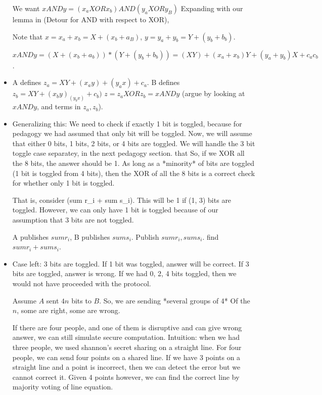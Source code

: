 \begin{itemize}
  We want $x AND y = (x_a XOR x_b) AND (y_a XOR y_B)$ Expanding with our lemma in (Detour for AND with respect to XOR),

  Note that $x = x_a + x_b = X + (x_b + a_B)$, $y = y_a + y_b = Y + (y_b + b_b)$.
  
  $x AND y = (X + (x_b + a_b)) * (Y + (y_b + b_b)) = (XY) + (x_a + x_b)Y + (y_a + y_b)X + c_a c_b$.


\item A defines $z_a = XY + (x_a y) + (y_a x) + c_a$. B defines $z_b = XY + (x_b y) _ (y_b x) + c_b)$
  $z = z_a XOR z_b = x AND y$ (argue by looking at $x AND y$, and terms in $z_a, z_b$).


\item Generalizing this: We need to check if exactly 1 bit is toggled, because for pedagogy we had assumed that only
  bit will be toggled. Now, we will assume that either 0 bits, 1 bits, 2 bits, or 4 bits are toggled. We will
  handle the 3 bit toggle case separatey, in the next pedagogy section.
  that 
  So, if we XOR all the 8 bits, the answer should be 1. As long as a *minority* of bits are toggled (1 bit is toggled from 4 bits),
  then the XOR of all the 8 bits is a correct check for whether only 1 bit is toggled.

  That is, consider (sum r_i + sum s_i). This will be 1 if (1, 3) bits are toggled. However, we can only have 1 bit is
  toggled because of our assumption that 3 bits are not toggled.

  A publishes $sum r_i$, B publishes $sum s_i$. Publish $sum r_i, sum s_i$. find $sum r_i + sum s_i$.


\item Case left: 3 bits are toggled. If 1 bit was toggled, answer will be correct. If 3 bits are toggled, answer is wrong.
  If we had 0, 2, 4 bits toggled, then we would not have proceeded with the protocol.

  Assume $A$ sent $4n$ bits to $B$. So, we are sending *several groups of 4* Of the $n$, some are right, some are wrong.

  If there are four people, and one of them is disruptive and can give wrong answer, we can still simulate  secure computation.
  Intuition: when we had three people, we used shannon's secret sharing on a straight line. For four people, we can send
  four points on a shared line. If we have 3 points on a straight line and a point is incorrect, then we can detect the error
  but we cannot correct it. Given 4 points however, we can find the correct line by majority voting of line equation.


\end{itemize}
